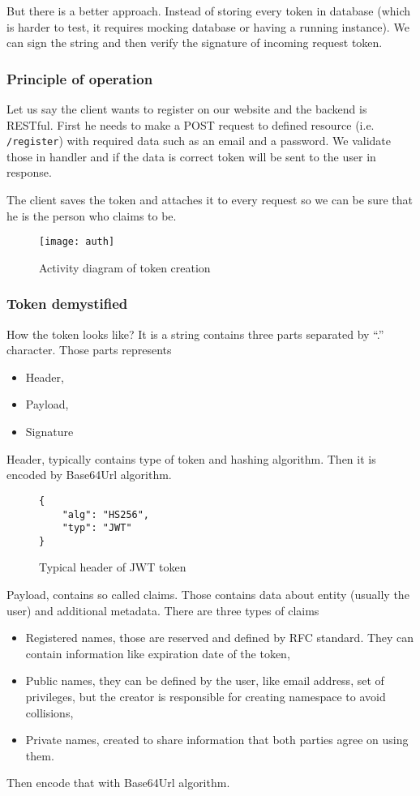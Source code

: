 But there is a better approach. Instead of storing every token in database (which is harder to test, it requires mocking database or having a running instance). We can sign the string and then verify the signature of incoming request token.

\subsubsection{Principle of operation}
Let us say the client wants to register on our website and the backend is RESTful. First he needs to make a POST request to defined resource (i.e. \verb|/register|) with required data such as an email and a password. We validate those in handler and if the data is correct token will be sent to the user in response.

The client saves the token and attaches it to every request so we can be sure that he is the person who claims to be.

\clearpage
\begin{figure}[!htbp]
\centering
\texttt{[image: auth]}
\label{fig:auth}
\caption{Activity diagram of token creation}
\end{figure}

\subsubsection{Token demystified}
How the token looks like? It is a string contains three parts separated by ``.'' character\cite{JWT-introduction}. Those parts represents
\begin{itemize}
\item Header,
\item Payload,
\item Signature
\end{itemize}

Header, typically contains type of token and hashing algorithm. Then it is encoded by Base64Url algorithm.
\begin{figure}[!htbp]
\begin{verbatim}
{
    "alg": "HS256",
    "typ": "JWT"
}
\end{verbatim}
\caption{Typical header of JWT token}
\label{src:typical-header}
\end{figure}

Payload, contains so called claims. Those contains data about entity (usually the user) and additional metadata. There are three types of claims
\begin{itemize}
\item Registered names, those are reserved and defined by RFC standard. They can contain information like expiration date of the token\cite{JWT-rfc},
\item Public names, they can be defined by the user, like email address, set of privileges, but the creator is responsible for creating namespace to avoid collisions,
\item Private names, created to share information that both parties agree on using them.
\end{itemize}
Then encode that with Base64Url algorithm.

